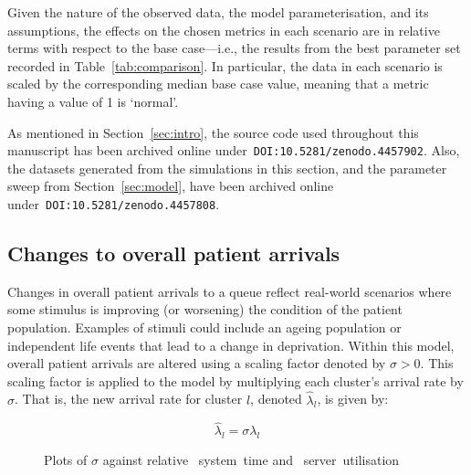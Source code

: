 \documentclass[]{interact}
\newlength{\imgwidth}
\theoremstyle{plain}%
\theoremstyle{definition}
\theoremstyle{remark}
\begin{document}
Given the nature of the observed data, the model parameterisation, and
its assumptions, the effects on the chosen metrics in each scenario are in
relative terms with respect to the base case---i.e., the results from the best
parameter set recorded in Table~\ref{tab:comparison}. In particular, the data
in each scenario is scaled by the corresponding median base case value, meaning
that a metric having a value of 1 is `normal'.

As mentioned in Section~\ref{sec:intro}, the source code used throughout this
manuscript has been archived online under~\texttt{DOI:10.5281/zenodo.4457902}.
Also, the datasets generated from the simulations in this section, and the
parameter sweep from Section~\ref{sec:model}, have been archived online
under~\texttt{DOI:10.5281/zenodo.4457808}.


\subsection{Changes to overall patient arrivals}\label{subsec:arrivals}

Changes in overall patient arrivals to a queue reflect real-world scenarios
where some stimulus is improving (or worsening) the condition of the patient
population. Examples of stimuli could include an ageing population or
independent life events that lead to a change in deprivation. Within this model,
overall patient arrivals are altered using a scaling factor denoted by
\(\sigma > 0\). This scaling factor is applied to the model by multiplying each
cluster's arrival rate by \(\sigma\). That is, the new arrival rate for cluster
\(l\), denoted \(\hat\lambda_l\), is given by:

\begin{equation}\label{eq:lambda}
    \hat\lambda_{l} = \sigma\lambda_l
\end{equation}

\begin{figure}
    \centering

    \caption{%
        Plots of \(\sigma\) against relative
        ~system~time and
        ~server~utilisation
    }\label{fig:lambda}
\end{figure}
\end{document}
